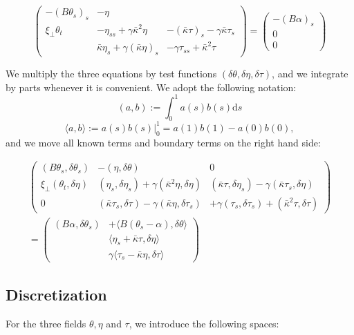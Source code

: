 \documentclass[12pt]{article}
\renewcommand{\d}{\mathrm{d}}
\begin{document}
\[\begin{pmatrix}
-(B\theta_s)_s & -\eta &  \\
\xi_\perp\theta_t & 
-\eta_{ss} + \gamma \bar \kappa^2\eta &
- (\bar\kappa\tau)_s - \gamma\bar\kappa\tau_s \\
 & 
\bar \kappa\eta_s +\gamma(\bar \kappa\eta)_s &
 - \gamma\tau_{ss} + \bar \kappa^2 \tau
\end{pmatrix}
%
=
\begin{pmatrix}
-(B\alpha)_s\\
0\\
0
\end{pmatrix}\]

We multiply the three equations by test functions
$(\delta \theta, \delta\eta, \delta \tau)$, and we integrate by parts
whenever it is convenient. We adopt the following notation:
\[
(a,b) := \int_0^1 a(s) b(s) \d s
\]
\[
\langle a,b \rangle := a(s) b(s) \big|^1_0 = a(1)b(1)-a(0)b(0),
\]
and we move all known terms and boundary terms on the right hand side:

\begin{multline}
\begin{pmatrix}
(B\theta_s, \delta \theta_s)  &  -(\eta,\delta\theta)  & 0 \\
\xi_\perp(\theta_t, \delta \eta) & 
(\eta_{s}, \delta \eta_s) 
+ \gamma (\bar \kappa^2\eta, \delta\eta) &
 (\bar\kappa\tau, \delta\eta_s) 
- \gamma(\bar\kappa\tau_s, \delta\eta) \\
0 & 
(\bar \kappa\tau_s, \delta\tau) 
-\gamma(\bar \kappa\eta, \delta\tau_s) &
%
%
+ \gamma(\tau_{s},\delta\tau_s) 
+ (\bar \kappa^2 \tau, \delta\tau)
\end{pmatrix}
%
\\
=
\begin{pmatrix}
(B\alpha, \delta \theta_s)& +\langle B(\theta_s-\alpha), \delta \theta\rangle\\
& \langle \eta_s+\bar\kappa\tau,\delta\eta\rangle
\\
&\gamma\langle\tau_{s}-\bar \kappa\eta, \delta\tau\rangle 
\end{pmatrix}
\end{multline}

\subsection{Discretization}

For the three fields $\theta, \eta$ and $\tau$, we introduce the
following spaces:
\end{document}
